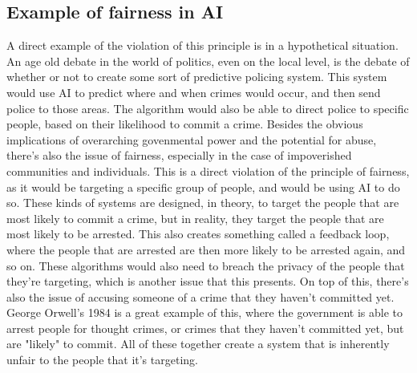 \subsection{Example of fairness in AI}
A direct example of the violation of this principle is in a hypothetical situation. An age old
debate in the world of politics, even on the local level, is the debate of whether or not to
create some sort of predictive policing system. This system would use AI to predict where and
when crimes would occur, and then send police to those areas. The algorithm would also be able
to direct police to specific people, based on their likelihood to commit a crime. Besides the 
obvious implications of overarching govenmental power and the potential for abuse, there's also
the issue of fairness, especially in the case of impoverished communities and individuals. This
is a direct violation of the principle of fairness, as it would be targeting a specific group
of people, and would be using AI to do so. These kinds of systems are designed, in theory, to
target the people that are most likely to commit a crime, but in reality, they target the people
that are most likely to be arrested. This also creates something called a feedback loop, where 
the people that are arrested are then more likely to be arrested again, and so on. These algorithms
would also need to breach the privacy of the people that they're targeting, which is another
issue that this presents. On top of this, there's also the issue of accusing someone of a crime
that they haven't committed yet. George Orwell's 1984 is a great example of this, where the
government is able to arrest people for thought crimes, or crimes that they haven't committed
yet, but are "likely" to commit. All of these together create a system that is inherently unfair
to the people that it's targeting.


